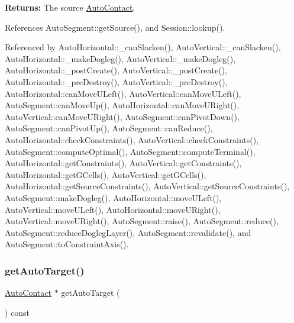 {\bfseries Returns\+:} The source \mbox{\hyperlink{classKatabatic_1_1AutoContact}{Auto\+Contact}}. 

References Auto\+Segment\+::get\+Source(), and Session\+::lookup().



Referenced by Auto\+Horizontal\+::\+\_\+can\+Slacken(), Auto\+Vertical\+::\+\_\+can\+Slacken(), Auto\+Horizontal\+::\+\_\+make\+Dogleg(), Auto\+Vertical\+::\+\_\+make\+Dogleg(), Auto\+Horizontal\+::\+\_\+post\+Create(), Auto\+Vertical\+::\+\_\+post\+Create(), Auto\+Horizontal\+::\+\_\+pre\+Destroy(), Auto\+Vertical\+::\+\_\+pre\+Destroy(), Auto\+Horizontal\+::can\+Move\+U\+Left(), Auto\+Vertical\+::can\+Move\+U\+Left(), Auto\+Segment\+::can\+Move\+Up(), Auto\+Horizontal\+::can\+Move\+U\+Right(), Auto\+Vertical\+::can\+Move\+U\+Right(), Auto\+Segment\+::can\+Pivot\+Down(), Auto\+Segment\+::can\+Pivot\+Up(), Auto\+Segment\+::can\+Reduce(), Auto\+Horizontal\+::check\+Constraints(), Auto\+Vertical\+::check\+Constraints(), Auto\+Segment\+::compute\+Optimal(), Auto\+Segment\+::compute\+Terminal(), Auto\+Horizontal\+::get\+Constraints(), Auto\+Vertical\+::get\+Constraints(), Auto\+Horizontal\+::get\+G\+Cells(), Auto\+Vertical\+::get\+G\+Cells(), Auto\+Horizontal\+::get\+Source\+Constraints(), Auto\+Vertical\+::get\+Source\+Constraints(), Auto\+Segment\+::make\+Dogleg(), Auto\+Horizontal\+::move\+U\+Left(), Auto\+Vertical\+::move\+U\+Left(), Auto\+Horizontal\+::move\+U\+Right(), Auto\+Vertical\+::move\+U\+Right(), Auto\+Segment\+::raise(), Auto\+Segment\+::reduce(), Auto\+Segment\+::reduce\+Dogleg\+Layer(), Auto\+Segment\+::revalidate(), and Auto\+Segment\+::to\+Constraint\+Axis().

\mbox{\label{classKatabatic_1_1AutoSegment_afa494ddc031f4dd1c24999ff83fb878c}} 
\subsubsection{\texorpdfstring{get\+Auto\+Target()}{getAutoTarget()}}
{\footnotesize\ttfamily \mbox{\hyperlink{classKatabatic_1_1AutoContact}{Auto\+Contact}} $\ast$ get\+Auto\+Target (\begin{DoxyParamCaption}{ }\end{DoxyParamCaption}) const\hspace{0.3cm}{\ttfamily [inline]}}

